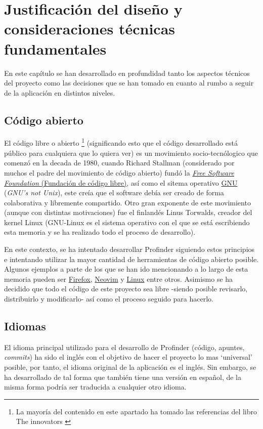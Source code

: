 \chapter{Justificación del diseño y consideraciones técnicas fundamentales}
\label{cap:JustificacionYConsideraciones}
En este capítulo se han desarrollado en profundidad tanto los aspectos técnicos del proyecto como las decisiones que se han tomado en cuanto al rumbo a seguir de la aplicación en distintos niveles.
\section{Código abierto}
\label{subsec:openSource}
El código libre o abierto
\footnote{La mayoría del contenido en este apartado ha tomado las referencias del libro The innovators \citep{Innovators}} 
(significando esto que el código desarrollado está público para cualquiera que lo quiera ver)
es un movimiento socio-tecnólogico que comenzó en la decada de 1980, cuando Richard Stallman (considerado por muchos el padre del movimiento de código abierto) fundó la \href{https://www.fsf.org/}{\textit{Free Software Foundation} (Fundación de código libre)}, así como el sitema operativo \href{https://www.gnu.org/}{GNU} (\textit{GNU's not Unix}), este creía que el software debía ser  creado de forma colaborativa y libremente compartido. Otro gran exponente de este movimiento (aunque con distintas motivaciones) fue el finlandés Linus Torwalds, creador del kernel Linux (GNU-Linux es el sistema operativo con el que se está escribiendo esta memoria y se ha realizado todo el proceso de desarrollo).

En este contexto, se ha intentado desarrollar Profinder siguiendo estos principios e intentando utilizar la mayor cantidad de herramientas de código abierto posible. Algunos ejemplos a parte de los que se han ido mencionando a lo largo de esta memoria pueden ser \href{https://www.mozilla.org/es-ES/firefox/}{Firefox}, \href{https://neovim.io/}{Neovim} y \href{https://www.linux.org/pages/}{Linux} entre otros. Asimismo se ha decidido que todo el código de este proyecto sea libre -siendo posible revisarlo, distribuirlo y modificarlo- así como el proceso seguido para hacerlo.

\section{Idiomas}
El idioma principal utilizado para el desarrollo de Profinder (código, apuntes, \textit{commits}) ha sido el inglés con el objetivo de hacer el proyecto lo mas ‘universal’ posible, por tanto, el idioma original de la aplicación es el inglés. Sin embargo, se ha desarrollado de tal forma que también tiene una versión en español, de la misma forma podría ser traducida a cualquier otro idioma.

